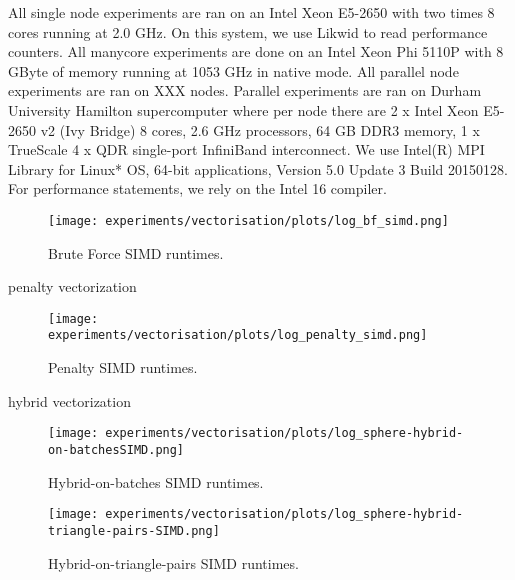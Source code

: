 All single node experiments are ran on an Intel Xeon E5-2650 with two times 8
cores running at 2.0 GHz. 
On this system, we use Likwid \cite{Treibig:10:Likwid} to read performance
counters.
All manycore experiments are done on an Intel Xeon Phi 5110P with 8 GByte of
memory running  at 1053 GHz in native mode.
All parallel node experiments are ran on XXX nodes. Parallel experiments are ran on Durham University Hamilton supercomputer where per node there are 2 x Intel Xeon E5-2650 v2 (Ivy Bridge) 8 cores, 2.6 GHz processors, 64 GB DDR3 memory, 1 x TrueScale 4 x QDR single-port InfiniBand interconnect.
We use Intel(R) MPI Library for Linux* OS, 64-bit applications, Version 5.0 Update 3  Build 20150128. 
For performance statements, we rely on the Intel 16 compiler.



\begin{figure}[htb]
  \begin{center}
    \texttt{[image: experiments/vectorisation/plots/log\_bf\_simd.png]}
  \end{center}
  \caption{Brute Force SIMD runtimes.}
  \label{figure:triangle_omp}
\end{figure}


penalty vectorization

\begin{figure}[htb]
  \begin{center}
    \texttt{[image: experiments/vectorisation/plots/log\_penalty\_simd.png]}
  \end{center}
  \caption{Penalty SIMD runtimes.}
  \label{figure:triangle_omp}
\end{figure}

hybrid vectorization

\begin{figure}[htb]
  \begin{center}
    \texttt{[image: experiments/vectorisation/plots/log\_sphere-hybrid-on-batchesSIMD.png]}
  \end{center}
  \caption{Hybrid-on-batches SIMD runtimes.}
  \label{figure:triangle_omp}
\end{figure}


\begin{figure}[htb]
  \begin{center}
    \texttt{[image: experiments/vectorisation/plots/log\_sphere-hybrid-triangle-pairs-SIMD.png]}
  \end{center}
  \caption{Hybrid-on-triangle-pairs SIMD runtimes.}
  \label{figure:triangle_omp}
\end{figure}

